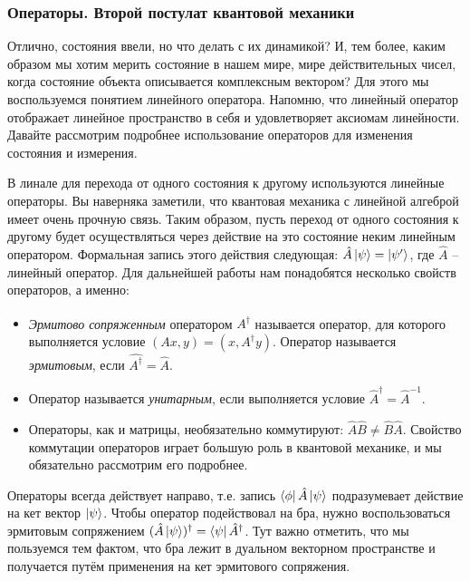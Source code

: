 \subsubsection*{Операторы. Второй постулат квантовой механики}

\hspace{1em} Отлично, состояния ввели, но что делать с их динамикой? И, тем более, каким образом мы хотим мерить состояние в нашем мире, мире действительных чисел, когда состояние объекта описывается комплексным вектором? Для этого мы воспользуемся понятием линейного оператора. Напомню, что линейный оператор отображает линейное пространство в себя и удовлетворяет аксиомам линейности. Давайте рассмотрим подробнее использование операторов для изменения состояния и измерения.

В линале для перехода от одного состояния к другому используются линейные операторы. Вы наверняка заметили, что квантовая механика с линейной алгеброй имеет очень прочную связь. Таким образом, пусть переход от одного состояния к другому будет осуществляться через действие на это состояние неким линейным оператором. Формальная запись этого действия следующая: $\hat{A}\ket{\psi} = \ket{\psi'}$, где $\hat{A}$ -- линейный оператор. Для дальнейшей работы нам понадобятся несколько свойств операторов, а именно:
\begin{itemize}
    \item \textit{Эрмитово сопряженным} оператором $\hat{A^{\dagger}}$ называется оператор, для которого выполняется условие $(Ax, y) = (x, A^{\dagger}y)$. Оператор называется \textit{эрмитовым}, если $\hat{A^{\dagger}} = \hat{A}$.
    \item Оператор называется \textit{унитарным}, если выполняется условие $\hat{A}^{\dagger} = \hat{A}^{-1}$.
    \item Операторы, как и матрицы, необязательно коммутируют: $\hat{A}\hat{B} \neq \hat{B}\hat{A}$. Свойство коммутации операторов играет большую роль в квантовой механике, и мы обязательно рассмотрим его подробнее.
\end{itemize}
Операторы всегда действует направо, т.е. запись $\bra{\phi}\hat{A}\ket{\psi}$ подразумевает действие на кет вектор $\ket{\psi}$. Чтобы оператор подействовал на бра, нужно воспользоваться эрмитовым сопряжением $(\hat{A}\ket{\psi})^{\dagger} = \bra{\psi}\hat{A}^{\dagger}$. Тут важно отметить, что мы пользуемся тем фактом, что бра лежит в дуальном векторном пространстве и получается путём применения на кет эрмитового сопряжения.

